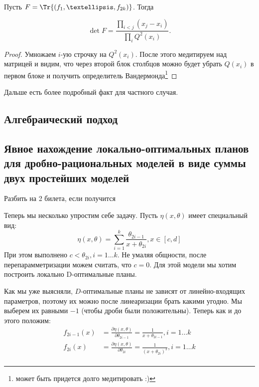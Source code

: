 Пусть $F = \Tr{(f_1, …, f_{2k})}$. Тогда
\begin{thm}
\begin{equation}
\label{rationModelDet}
\det F = \frac{\prod\limits_{i<j} (x_j - x_i)}{\prod\limits_{i} Q^2(x_i)}.
\end{equation}
\end{thm}
\begin{proof}
Умножаем  $i$-ую строчку на $Q^2(x_i)$. После этого медитируем над матрицей и видим, что через второй блок столбцов можно будет убрать $Q(x_i)$ в первом блоке и получить определитель Вандермонда\footnote{может быть придется долго медитировать :)}
\end{proof}

{\color{blue} Дальше есть более подробный факт для частного случая. }

\subsection{Алгебраический подход}
\subsection{Явное нахождение локально-оптимальных планов для дробно-рациональных моделей в виде суммы двух простейших моделей}

{\color{blue} Разбить на 2 билета, если получится}

Теперь мы несколько упростим себе задачу. Пусть $\eta(x, \theta)$ имеет специальный вид:
\begin{equation}
\label{simplRatModel}
\eta(x,\theta) = \sum\limits_{i=1}^{k} \frac{\theta_{2i-1}}{x+\theta_{2i}}, x\in[c,d]
\end{equation}
При этом выполнено $c < \theta_{2i}, i=1…k$. Не умаляя общности, после перепарамметризации можем считать,  что $c=0$. Для этой модели мы хотим построить локально D-оптимальные планы.

Как мы уже выясняли, $D$-оптимальные планы не зависят от линейно-входящих параметров, поэтому их можно после линеаризации брать какими угодно. Мы выберем их равными $-1$ (чтобы дроби были положительны). Теперь как и до этого положим:
\begin{align*}
f_{2i-1}(x) &= \frac{\partial \eta(x, \theta)}{\partial{\theta_{2i-1}}} = \frac{1}{x+\theta_{2i-1}}, i =1 … k \\
f_{2i}(x) &= \frac{\partial \eta(x, \theta)}{\partial{\theta_{2i}}} = \frac{1}{(x+\theta_{2i})^2}, i =1…k\\
\end{align*}

